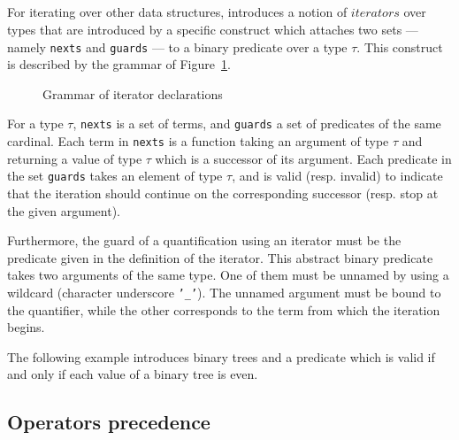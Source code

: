 \subsection*{{}} For
iterating over other data structures, \eacsl introduces a notion of $iterators$
over types that are introduced by a specific construct which attaches two sets
--- namely \texttt{nexts} and \texttt{guards} --- to a binary predicate over
a type $\tau$. This construct is
described by the grammar of Figure~\ref{fig:gram:iterator}.
  \begin{figure}[htbp]
    \begin{cadre}
      
    \end{cadre}
    \caption{Grammar of iterator declarations}
    \label{fig:gram:iterator}
  \end{figure}
  For a type $\tau$, \texttt{nexts} is a set of terms, and \texttt{guards} a set
  of predicates of the same cardinal. Each term in \texttt{nexts} is a function
  taking an argument of type $\tau$ and returning a value of type $\tau$ which
  is a successor of its argument. Each predicate in the set \texttt{guards}
  takes an
  element of type $\tau$, and is valid (resp. invalid) to indicate that the
  iteration should continue on the corresponding successor (resp.  stop at the
  given argument).

  Furthermore, the guard of a quantification using an iterator must be the
  predicate given in the definition of the iterator. This abstract binary
  predicate takes two arguments of the same type. One of them must be unnamed by
  using a wildcard (character underscore \texttt{'\_'}). The unnamed argument
  must be bound to the quantifier, while the other corresponds to the term from
  which the iteration begins.
  \begin{example}
    The following example introduces binary trees and a predicate which is valid
    if and only if each value of a binary tree is even.
  \end{example}


\subsection{Operators precedence}
\nodiff


